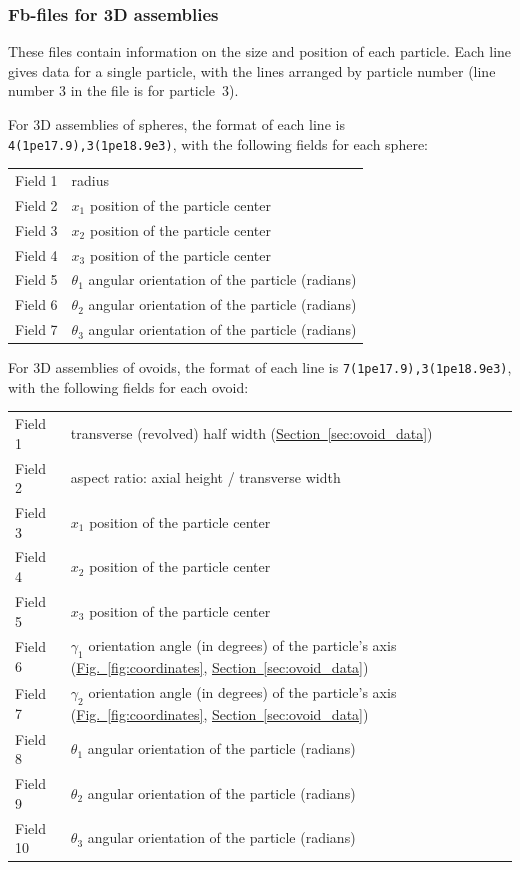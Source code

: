 \documentclass[letterpaper,11pt]{article}
\begin{document}
\subsubsection{Fb-files for 3D assemblies}\label{sec:f2files3d}
These files contain information on the size and position of each particle.
Each line gives data for a single particle, with the
lines arranged by particle number (line number 3 in the file is 
for particle~3).
\par
For 3D assemblies of spheres,
the format of each line is \texttt{4(1pe17.9),3(1pe18.9e3)}, with
the following fields 
for each sphere:\\
\begin{center}
\begin{tabular}{lp{3.5in}}
Field 1 & radius \\
Field 2 & $x_{1}$ position of the particle center\\
Field 3 & $x_{2}$ position of the particle center\\
Field 4 & $x_{3}$ position of the particle center\\
Field 5 & $\theta_{1}$ angular orientation of the particle (radians)\\
Field 6 & $\theta_{2}$ angular orientation of the particle (radians)\\
Field 7 & $\theta_{3}$ angular orientation of the particle (radians)
\end{tabular}
\end{center}
\par
For 3D assemblies of ovoids,
the format of each line is \texttt{7(1pe17.9),3(1pe18.9e3)}, with
the following fields
for each ovoid:\\
\begin{center}
\begin{tabular}{lp{3.5in}}
Field 1 & transverse (revolved) half width
(\hyperref[sec:ovoid_data]{Section~\ref*{sec:ovoid_data}})\\
Field 2 & aspect ratio:  axial height / transverse width \\
Field 3 & $x_{1}$ position of the particle center\\
Field 4 & $x_{2}$ position of the particle center\\
Field 5 & $x_{3}$ position of the particle center\\
Field 6 & $\gamma_{1}$ orientation angle (in degrees) of
the particle's axis
(\hyperref[fig:coordinates]{Fig.~\ref*{fig:coordinates}},
\hyperref[sec:ovoid_data]{Section~\ref*{sec:ovoid_data}})\\
Field 7 & $\gamma_{2}$ orientation angle (in degrees) of
the particle's axis
(\hyperref[fig:coordinates]{Fig.~\ref*{fig:coordinates}},
\hyperref[sec:ovoid_data]{Section~\ref*{sec:ovoid_data}})\\
Field 8 & $\theta_{1}$ angular orientation of the particle (radians)\\
Field 9 & $\theta_{2}$ angular orientation of the particle (radians)\\
Field 10 & $\theta_{3}$ angular orientation of the particle (radians)
\end{tabular}
\end{center}
\end{document}
